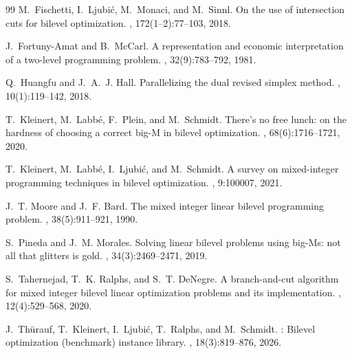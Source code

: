 \documentclass[11pt]{article}
\begin{document}
\begin{thebibliography}{99}
M.~Fischetti, I.~Ljubi{\'c}, M.~Monaci, and M.~Sinnl.
\newblock On the use of intersection cuts for bilevel optimization.
, 172(1--2):77--103, 2018.

J.~Fortuny-Amat and B.~McCarl.
\newblock A representation and economic interpretation of a two-level programming problem.
, 32(9):783--792, 1981.

Q.~Huangfu and J.~A.~J. Hall.
\newblock Parallelizing the dual revised simplex method.
, 10(1):119--142, 2018.

T.~Kleinert, M.~Labb{\'e}, F.~Plein, and M.~Schmidt.
\newblock There's no free lunch: on the hardness of choosing a correct big-{M} in bilevel optimization.
, 68(6):1716--1721, 2020.

T.~Kleinert, M.~Labb{\'e}, I.~Ljubi{\'c}, and M.~Schmidt.
\newblock A survey on mixed-integer programming techniques in bilevel optimization.
, 9:100007, 2021.

J.~T. Moore and J.~F. Bard.
\newblock The mixed integer linear bilevel programming problem.
, 38(5):911--921, 1990.

S.~Pineda and J.~M. Morales.
\newblock Solving linear bilevel problems using big-{M}s: not all that glitters is gold.
, 34(3):2469--2471, 2019.

S.~Tahernejad, T.~K. Ralphs, and S.~T. DeNegre.
\newblock A branch-and-cut algorithm for mixed integer bilevel linear optimization problems and its implementation.
, 12(4):529--568, 2020.

J.~Th{\"u}rauf, T.~Kleinert, I.~Ljubi{\'c}, T.~Ralphs, and M.~Schmidt.
: Bilevel optimization (benchmark) instance library.
, 18(3):819--876, 2026.

\end{thebibliography}
\end{document}
